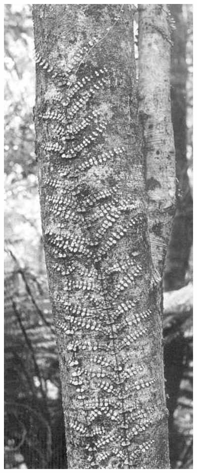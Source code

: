 \begin{figure}[!htb]
	\centering
	\begin{minipage}[t]{0.454\textwidth}
		\centering
		\includegraphics[width=0.9\textwidth]{graphics/figure30rata.jpg}

\end{minipage}
\end{figure}
